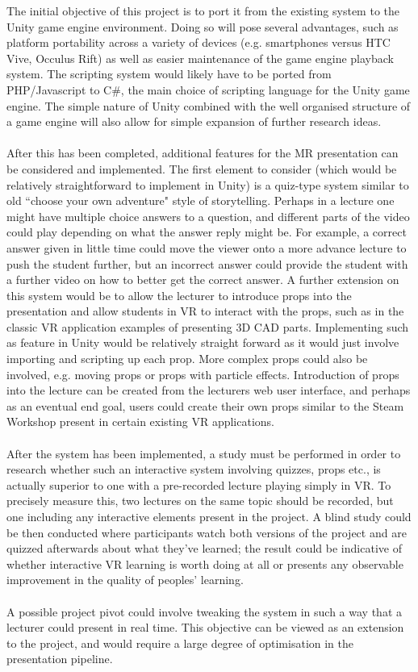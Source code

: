 \documentclass[11pt]{report}
\begin{document}
The initial objective of this project is to port it from the existing system to the Unity game engine environment. Doing so will pose several advantages, such as platform portability across a variety of devices (e.g. smartphones versus HTC Vive, Occulus Rift) as well as easier maintenance of the game engine playback system. The scripting system would likely have to be ported from PHP/Javascript to C\#, the main choice of scripting language for the Unity game engine. The simple nature of Unity combined with the well organised structure of a game engine will also allow for simple expansion of further research ideas.\\~\\
After this has been completed, additional features for the MR presentation can be considered and implemented. The first element to consider (which would be relatively straightforward to implement in Unity) is a quiz-type system similar to old ``choose your own adventure" style of storytelling. Perhaps in a lecture one might have multiple choice answers to a question, and different parts of the video could play depending on what the answer reply might be. For example, a correct answer given in little time could move the viewer onto a more advance lecture to push the student further, but an incorrect answer could provide the student with a further video on how to better get the correct answer. A further extension on this system would be to allow the lecturer to introduce props into the presentation and allow students in VR to interact with the props, such as in the classic VR application examples of presenting 3D CAD parts. Implementing such as feature in Unity would be relatively straight forward as it would just involve importing and scripting up each prop. More complex props could also be involved, e.g. moving props or props with particle effects. Introduction of props into the lecture can be created from the lecturers web user interface, and perhaps as an eventual end goal, users could create their own props similar to the Steam Workshop present in certain existing VR applications\cite{Education2016}.\\~\\
After the system has been implemented, a study must be performed in order to research whether such an interactive system involving quizzes, props etc., is actually superior to one with a pre-recorded lecture playing simply in VR. To precisely measure this, two lectures on the same topic should be recorded, but one including any interactive elements present in the project. A blind study could be then conducted where participants watch both versions of the project and are quizzed afterwards about what they've learned; the result could be indicative of whether interactive VR learning is worth doing at all or presents any observable improvement in the quality of peoples' learning.\\~\\
A possible project pivot could involve tweaking the system in such a way that a lecturer could present in real time. This objective can be viewed as an extension to the project, and would require a large degree of optimisation in the presentation pipeline. 
\end{document}
